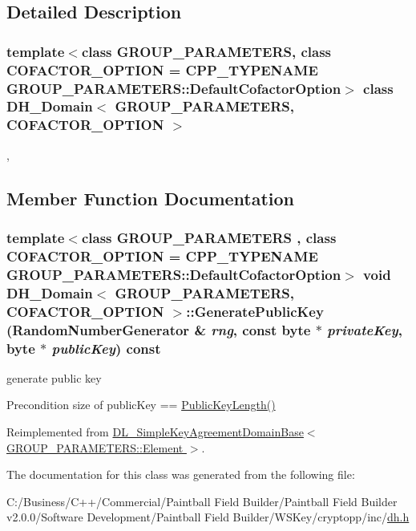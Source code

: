 \subsection{Detailed Description}
\subsubsection*{template$<$class GROUP\_\-PARAMETERS, class COFACTOR\_\-OPTION = CPP\_\-TYPENAME GROUP\_\-PARAMETERS::DefaultCofactorOption$>$ class DH\_\-Domain$<$ GROUP\_\-PARAMETERS, COFACTOR\_\-OPTION $>$}

, 

\subsection{Member Function Documentation}
\hypertarget{class_d_h___domain_ab1fd61cdab38427665d83a4c37e66083}{
\subsubsection[{GeneratePublicKey}]{\setlength{\rightskip}{0pt plus 5cm}template$<$class GROUP\_\-PARAMETERS , class COFACTOR\_\-OPTION  = CPP\_\-TYPENAME GROUP\_\-PARAMETERS::DefaultCofactorOption$>$ void {\bf DH\_\-Domain}$<$ GROUP\_\-PARAMETERS, COFACTOR\_\-OPTION $>$::GeneratePublicKey ({\bf RandomNumberGenerator} \& {\em rng}, \/  const byte $\ast$ {\em privateKey}, \/  byte $\ast$ {\em publicKey}) const}}
\label{class_d_h___domain_ab1fd61cdab38427665d83a4c37e66083}


generate public key \begin{DoxyPrecond}{Precondition}
size of publicKey == \hyperlink{class_d_l___simple_key_agreement_domain_base_aeb0120a4c4170c0c6571e6800d92f2fe}{PublicKeyLength()} 
\end{DoxyPrecond}


Reimplemented from \hyperlink{class_d_l___simple_key_agreement_domain_base_a3e1caeee8c363962a1c766e53f95ef95}{DL\_\-SimpleKeyAgreementDomainBase$<$ GROUP\_\-PARAMETERS::Element $>$}.

The documentation for this class was generated from the following file:\begin{DoxyCompactItemize}
\item 
C:/Business/C++/Commercial/Paintball Field Builder/Paintball Field Builder v2.0.0/Software Development/Paintball Field Builder/WSKey/cryptopp/inc/\hyperlink{dh_8h}{dh.h}\end{DoxyCompactItemize}
